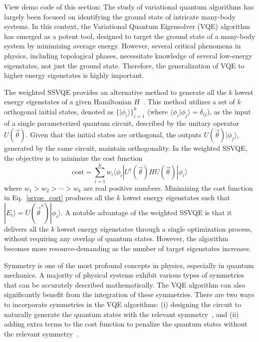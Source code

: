 View demo code of this section: 
The study of variational quantum algorithms has largely been focused on identifying the ground state of intricate many-body systems. In this context, the Variational Quantum Eigensolver (VQE) algorithm has emerged as a potent tool, designed to target the ground state of a many-body system by minimizing average energy. However, several critical phenomena in physics, including topological phases, necessitate knowledge of several low-energy eigenstates, not just the ground state. Therefore, the generalization of VQE to higher energy eigenstates is highly important.

The weighted SSVQE provides an alternative method to generate all the $k$ lowest energy eigenstates of a given Hamiltonian $H$~\cite{?}. This method utilizes a set of $k$ orthogonal initial states, denoted as $\{|\phi_{i}\rangle\}_{i=1}^{k}$ (where $\langle \phi_{i} | \phi_{j} \rangle = \delta_{ij}$), as the input of a single parameterized quantum circuit, described by the unitary operator $U(\vec{\theta})$. Given that the initial states are orthogonal, the outputs $U(\vec{\theta})| \phi_{j} \rangle$, generated by the same circuit, maintain orthogonality. In the weighted SSVQE, the objective is to minimize the cost function
\begin{equation}
    \mathrm{cost} = \sum_{i=1}^{k} w_{i} \langle \phi_{i}| U^{\dagger}(\vec{\theta}) H U(\vec{\theta}) | \phi_{i} \rangle
    \label{ssvqe_cost}
\end{equation}
where $w_1 > w_2 > \cdots > w_k$ are real positive numbers. Minimizing the cost function in Eq.~\eqref{ssvqe_cost} produces all the $k$ lowest energy eigenstates such that $|E_{i}\rangle = U(\vec{\theta}^{*})|\phi_{i}\rangle$.
A notable advantage of the weighted SSVQE is that it delivers all the $k$ lowest energy eigenstates through a single optimization process, without requiring any overlap of quantum states. However, the algorithm becomes more resource-demanding as the number of target eigenstates increases.

Symmetry is one of the most profound concepts in physics, especially in quantum mechanics. A majority of physical systems exhibit various types of symmetries that can be accurately described mathematically. The VQE algorithm can also significantly benefit from the integration of these symmetries. There are two ways to incorporate symmetries in the VQE algorithms: (i) designing the circuit to naturally generate the quantum states with the relevant symmetry~\cite{?}, and (ii) adding extra terms to the cost function to penalize the quantum states without the relevant symmetry~\cite{?}.


